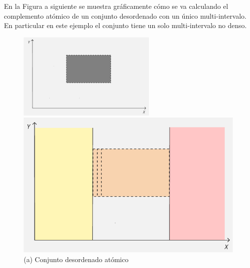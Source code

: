 En la Figura a siguiente se muestra gráficamente cómo se va calculando el complemento atómico de un conjunto desordenado con un único multi-intervalo. En particular en este ejemplo el conjunto tiene un solo multi-intervalo no denso.
 
\begin{figure}[H]
    \centering
    
    \includegraphics[width=0.6\textwidth]{figures/Conceptos previos/Conjuntos/compAtom1.png}
    \caption*{(a) Conjunto desordenado atómico}
    
    \vspace{1em}
    \begin{minipage}{0.41\textwidth}
        \centering
        \includegraphics[width=\textwidth]{figures/Conceptos previos/Conjuntos/compAtom2.png}
        

\end{minipage}
\end{figure}
